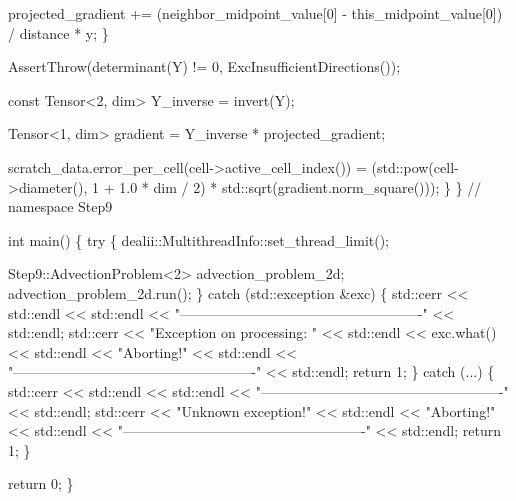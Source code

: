 \begin{DoxyCodeInclude}
        projected\_gradient +=
            (neighbor\_midpoint\_value[0] - this\_midpoint\_value[0]) / distance *
            y;
    \}

    AssertThrow(determinant(Y) != 0, ExcInsufficientDirections());

    \textcolor{keyword}{const} Tensor<2, dim> Y\_inverse = invert(Y);

    Tensor<1, dim> gradient = Y\_inverse * projected\_gradient;

    scratch\_data.error\_per\_cell(cell->active\_cell\_index()) =
        (std::pow(cell->diameter(), 1 + 1.0 * dim / 2) *
         std::sqrt(gradient.norm\_square()));
\}
\}  \textcolor{comment}{// namespace Step9}



\textcolor{keywordtype}{int} main()
\{
    \textcolor{keywordflow}{try} \{
        dealii::MultithreadInfo::set\_thread\_limit();

        Step9::AdvectionProblem<2> advection\_problem\_2d;
        advection\_problem\_2d.run();
    \} \textcolor{keywordflow}{catch} (std::exception &exc) \{
        std::cerr << std::endl
                  << std::endl
                  << \textcolor{stringliteral}{"----------------------------------------------------"}
                  << std::endl;
        std::cerr << \textcolor{stringliteral}{"Exception on processing: "} << std::endl
                  << exc.what() << std::endl
                  << \textcolor{stringliteral}{"Aborting!"} << std::endl
                  << \textcolor{stringliteral}{"----------------------------------------------------"}
                  << std::endl;
        \textcolor{keywordflow}{return} 1;
    \} \textcolor{keywordflow}{catch} (...) \{
        std::cerr << std::endl
                  << std::endl
                  << \textcolor{stringliteral}{"----------------------------------------------------"}
                  << std::endl;
        std::cerr << \textcolor{stringliteral}{"Unknown exception!"} << std::endl
                  << \textcolor{stringliteral}{"Aborting!"} << std::endl
                  << \textcolor{stringliteral}{"----------------------------------------------------"}
                  << std::endl;
        \textcolor{keywordflow}{return} 1;
    \}

    \textcolor{keywordflow}{return} 0;
\}
\end{DoxyCodeInclude}
 